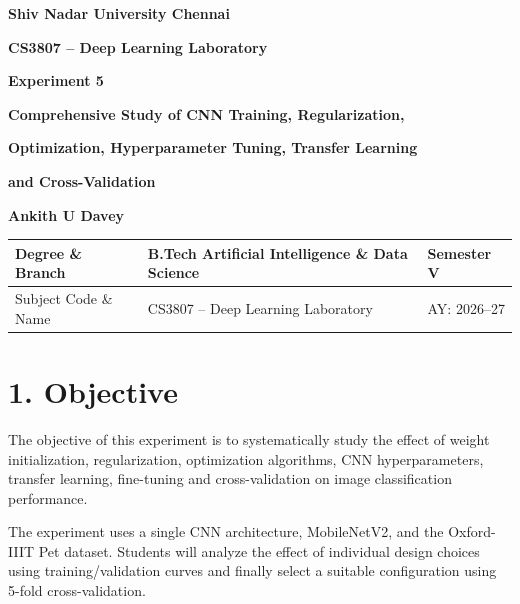 \documentclass[10pt]{article}
\begin{document}
\begin{center}

{\large\textbf{Shiv Nadar University Chennai}}

\vspace{2mm}

{\normalsize\textbf{CS3807 -- Deep Learning Laboratory}}

\vspace{2mm}

{\large\textbf{Experiment 5}}

\vspace{1mm}

{\normalsize\textbf{Comprehensive Study of CNN Training, Regularization,}}

{\normalsize\textbf{Optimization, Hyperparameter Tuning, Transfer Learning}}

{\normalsize\textbf{and Cross-Validation}}

{\normalsize\textbf{Ankith U Davey }}

\end{center}

\vspace{3mm}

\begin{tabular}{|p{3.4cm}|p{9.0cm}|p{1.4cm}|}
\hline
Degree \& Branch &
B.Tech Artificial Intelligence \& Data Science &
Semester V\\
\hline
Subject Code \& Name &
CS3807 -- Deep Learning Laboratory &
AY: 2026--27\\
\hline
\end{tabular}

\section*{1. Objective}

The objective of this experiment is to systematically study the effect of weight
initialization, regularization, optimization algorithms, CNN hyperparameters,
transfer learning, fine-tuning and cross-validation on image classification
performance.

The experiment uses a single CNN architecture, MobileNetV2, and the Oxford-IIIT
Pet dataset. Students will analyze the effect of individual design choices using
training/validation curves and finally select a suitable configuration using
5-fold cross-validation.

\end{document}
